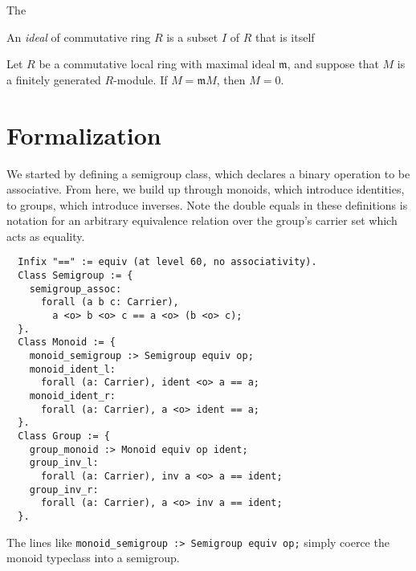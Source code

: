 \documentclass{article}
\begin{document}

The  

An \emph{ideal} of commutative ring $R$ is a subset $I$ of $R$ that is itself 
 

\begin{nak*}
Let $R$ be a commutative local ring with maximal ideal $\mathfrak{m}$, and suppose that $M$ is a finitely generated $R$-module.  If $M = \mathfrak{m} M$, then $M = 0$.
\end{nak*}



\section{Formalization}

We started by defining a semigroup class, which declares a binary operation to
be associative. From here, we build up through monoids, which introduce
identities, to groups, which introduce inverses. Note the double equals in
these definitions is notation for an arbitrary equivalence relation over the
group's carrier set which acts as equality.
\begin{verbatim}
  Infix "==" := equiv (at level 60, no associativity).
  Class Semigroup := {
    semigroup_assoc:
      forall (a b c: Carrier),
        a <o> b <o> c == a <o> (b <o> c);
  }.
  Class Monoid := {
    monoid_semigroup :> Semigroup equiv op;
    monoid_ident_l:
      forall (a: Carrier), ident <o> a == a;
    monoid_ident_r:
      forall (a: Carrier), a <o> ident == a;
  }.
  Class Group := {
    group_monoid :> Monoid equiv op ident;
    group_inv_l:
      forall (a: Carrier), inv a <o> a == ident;
    group_inv_r:
      forall (a: Carrier), a <o> inv a == ident;
  }.
\end{verbatim}
The lines like \verb|monoid_semigroup :> Semigroup equiv op;| simply coerce
the monoid typeclass into a semigroup.
\end{document}
